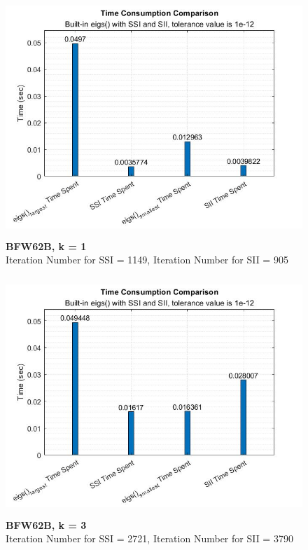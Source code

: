 \documentclass[12pt]{article}
\begin{document}
\begin{figure}[H]
	\centerline{\includegraphics[height=9cm, width=12cm]{plot1bfw.jpg}}
	\caption{\textbf{BFW62B, k = 1} \\ Iteration Number for SSI = 1149, Iteration Number for SII = 905}
	\label{fig7}\end{figure}

\begin{figure}[H]
	\centerline{\includegraphics[height=9cm, width=12cm]{plot3bfw.jpg}}
	\caption{\textbf{BFW62B, k = 3} \\ Iteration Number for SSI = 2721, Iteration Number for SII = 3790}
	\label{fig8}
\end{figure}
\end{document}
